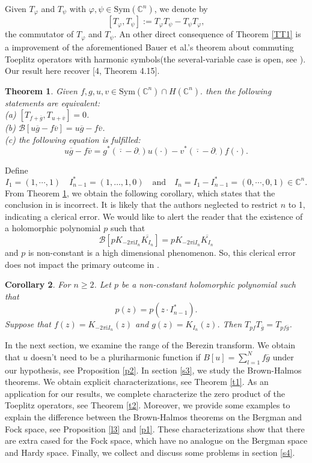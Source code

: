 \documentclass[11pt,reqno]{amsart}
\newtheorem{theorem}{Theorem}
\newtheorem{cor}[theorem]{Corollary}
\theoremstyle{definition}
\begin{document}
Given $T_\varphi$ and $T_\psi$ with $\varphi,\psi\in \text{Sym}(\mathbb{C}^n)$, we denote by
$$[T_{\varphi},T_\psi]:=T_\varphi T_\psi-T_\psi T_\varphi,$$
the commutator of $T_\varphi$ and $T_\psi$. An other direct consequence of Theorem \ref{TT1} is a  improvement of the aforementioned Bauer et al.'s theorem  about commuting Toeplitz operators with harmonic symbols(the several-variable case is open, see \cite{Bauer}). Our result here recover [4, Theorem 4.15].
\begin{theorem}\label{TT3}
Given $f,g,u,v\in \text{Sym}(\mathbb{C}^n)\cap H(\mathbb{C}^n).$ then the following statements are equivalent:\\
 (a) $[T_{f+\overline{g}},T_{u+\overline{v}}]=0$.\\
 (b)  $\mathcal{B}[u\overline{g}-f\overline{v}]=u\overline{g}-f\overline{v}$.\\
 (c)  the following equation is fulfilled:
\begin{equation}\label{E16}
u\overline{g}-f\overline{v}=g^*({\overline{\cdot}}-\partial_\cdot) u(\cdot)-v^*({\overline{\cdot}}-\partial_\cdot) f(\cdot).
\end{equation}
\end{theorem}
Define
$$I_1=(1,\cdots,1)\quad I_{n-1}^*=(1,\ldots,1,0)\quad\text{and}\quad I_n=I_1-I_{n-1}^*=(0,\cdots,0,1)\in \mathbb{C}^n.$$
From Theorem \ref{TT3}, we obtain the following corollary,  which states that the conclusion in \cite[Lemma 3.4]{Bauer1}  is incorrect. It is likely that the authors neglected to restrict $n$ to 1, indicating a clerical error. We would like to alert the reader that the existence of
a holomorphic polynomial $p$ such that $$\mathcal{B}[pK_{-2\pi \mathrm{i}I_n}\overline{K_{I_n}}]=pK_{-2\pi \mathrm{i}I_n}\overline{K_{I_n}}$$
and $p$ is non-constant is a high dimensional phenomenon. So, this clerical error does not impact the primary outcome in \cite{Bauer}.
\begin{cor}\label{c4}
For $n\geq2$. Let $p$ be a non-constant holomorphic polynomial such that $$p(z)=p(z\cdot I_{n-1}^*).$$ Suppose that $f(z)=K_{-2\pi \mathrm{i}I_n}(z)$ and $g(z)=K_{I_n}(z)$. Then $T_{pf}T_{\overline{g}}=T_{pf\overline{g}}$.
\end{cor}



In the next section, we examine the range of the Berezin transform. We obtain that $u$ doesn't need to be a pluriharmonic function if $B[u]=\sum_{l=1}^Nf\overline{g}$ under our  hypothesis, see Proposition \ref{p2}. In section \ref{s3}, we study the Brown-Halmos theorems. We obtain explicit characterizations, see Theorem \ref{t1}. As an application for our results, we complete characterize the zero product of the Toeplitz operators, see Theorem \ref{t2}. Moreover, we provide some examples to explain the  difference between the Brown-Halmos theorems on the Bergman and Fock space, see Proposition \ref{l3} and \ref{p1}.
 These characterizations show that
there are extra cased for the Fock space, which have no analogue on the Bergman space and Hardy space. Finally,
we collect and discuss some problems in section \ref{s4}.
\end{document}
